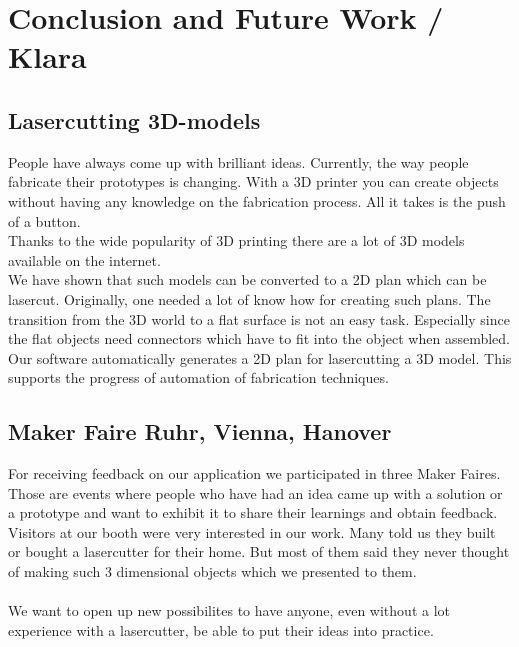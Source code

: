 \documentclass[../ClassicThesis.tex]{subfiles}
\begin{document}
\chapter{Conclusion and Future Work / Klara}\label{ch:conclusion}

\section{Lasercutting 3D-models}
People have always come up with brilliant ideas. Currently, the way people fabricate their prototypes is changing. With a 3D printer you can create objects without having any knowledge on the fabrication process. All it takes is the push of a button.\\
Thanks to the wide popularity of 3D printing there are a lot of 3D models available on the internet.\\
We have shown that such models can be converted to a 2D plan which can be lasercut. Originally, one needed a lot of know how for creating such plans. The transition from the 3D world to a flat surface is not an easy task. Especially since the flat objects need connectors which have to fit into the object when assembled. \\
Our software automatically generates a 2D plan for lasercutting a 3D model. This supports the progress of automation of fabrication techniques. 

\section{Maker Faire Ruhr, Vienna, Hanover}
For receiving feedback on our application we participated in three Maker Faires. \\
Those are events where people who have had an idea came up with a solution or a prototype and want to exhibit it to share their learnings and obtain feedback.\\
Visitors at our booth were very interested in our work. Many told us they built or bought a lasercutter for their home. But most of them said they never thought of making such 3 dimensional objects which we presented to them. 
\\\*\\
We want to open up new possibilites to have anyone, even without a lot experience with a lasercutter, be able to put their ideas into practice.
\end{document}
